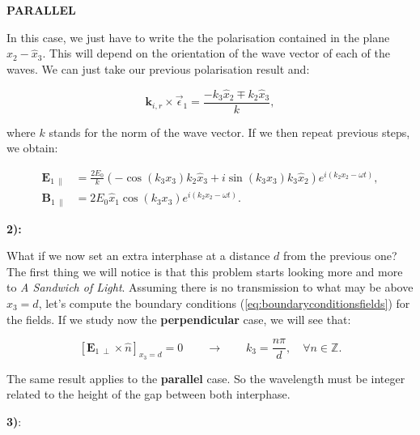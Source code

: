 \textbf{PARALLEL}
	
In this case, we just have to write the the polarisation contained in the plane $\hat{x}_{2} - \hat{x}_{3}$. This will depend on the orientation of the wave vector of each of the waves. We can just take our previous polarisation result and:
	
\begin{equation}
	\mathbf{k}_{i,r} \times \vec{\epsilon}_{1} = \frac{-k_{3} \hat{x}_{2} \mp k_{2} \hat{x}_{3}}{k}, 
\end{equation}

where $k$ stands for the norm of the wave vector. If we then repeat previous steps, we obtain:

\begin{equation}
	\begin{split}
		\mathbf{E}_{1\:\parallel} &= \frac{2 E_{0}}{k} \left(- \cos\left(k_{3} x_{3}\right) k_{2} \hat{x}_{3} + i \sin\left(k_{3} x_{3}\right) k_{3} \hat{x}_{2}\right) e^{i \left(k_{2} x_{2} -\omega t \right)},\\
		\mathbf{B}_{1\:\parallel} &= 2 E_{0} \hat{x}_{1} \cos\left(k_{3} x_{3}\right) e^{i\left(k_{2} x_{2} - \omega t\right)}. 
	\end{split}
\end{equation}

\textbf{2):}

What if we now set an extra interphase at a distance $d$ from the previous one? The first thing we will notice is that this problem starts looking more and more to \textit{A Sandwich of Light}. Assuming there is no transmission to what may be above $x_{3} = d$, let's compute the boundary conditions (\ref{eq:boundaryconditionsfields}) for the fields. If we study now the \textbf{perpendicular} case, we will see that:

\begin{equation}
	\left[\mathbf{E}_{1\:\perp} \times \hat{n}\right]_{x_{3} =d} =0 \qquad \rightarrow \qquad k_{3} = \frac{n \pi}{d}, \quad \forall n \in \mathbb{Z}. 
\end{equation} 

The same result applies to the \textbf{parallel} case. So the wavelength must be integer related to the height of the gap between both interphase.
	
\textbf{3)}:

